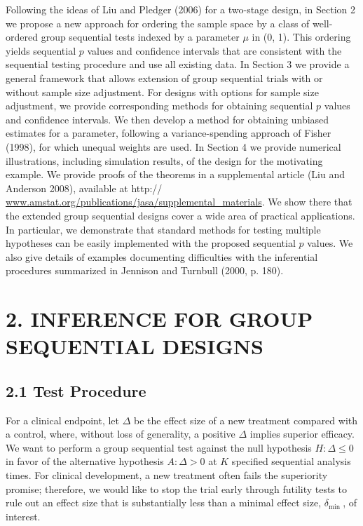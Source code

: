 \documentclass[10pt]{article}
\begin{document}
Following the ideas of Liu and Pledger (2006) for a two-stage design, in Section 2 we propose a new approach for ordering the sample space by a class of well-ordered group sequential tests indexed by a parameter $\mu$ in (0, 1). This ordering yields sequential $p$ values and confidence intervals that are consistent with the sequential testing procedure and use all existing data. In Section 3 we provide a general framework that allows extension of group sequential trials with or without sample size adjustment. For designs with options for sample size adjustment, we provide corresponding methods for obtaining sequential $p$ values and confidence intervals. We then develop a method for obtaining unbiased estimates for a parameter, following a variance-spending approach of Fisher (1998), for which unequal weights are used. In Section 4 we provide numerical illustrations, including simulation results, of the design for the motivating example. We provide proofs of the theorems in a supplemental article (Liu and Anderson 2008), available at http:// \href{http://www.amstat.org/publications/jasa/supplemental_materials}{www.amstat.org/publications/jasa/supplemental\_materials}. We show there that the extended group sequential designs cover a wide area of practical applications. In particular, we demonstrate that standard methods for testing multiple hypotheses can be easily implemented with the proposed sequential $p$ values. We also give details of examples documenting difficulties with the inferential procedures summarized in Jennison and Turnbull (2000, p. 180).

\section*{2. INFERENCE FOR GROUP SEQUENTIAL DESIGNS}
\subsection*{2.1 Test Procedure}
For a clinical endpoint, let $\Delta$ be the effect size of a new treatment compared with a control, where, without loss of generality, a positive $\Delta$ implies superior efficacy. We want to perform a group sequential test against the null hypothesis $H: \Delta \leq 0$ in favor of the alternative hypothesis $A: \Delta>0$ at $K$ specified sequential analysis times. For clinical development, a new treatment often fails the superiority promise; therefore, we would like to stop the trial early through futility tests to rule out an effect size that is substantially less than a minimal effect size, $\delta_{\text {min }}$, of interest.
\end{document}
